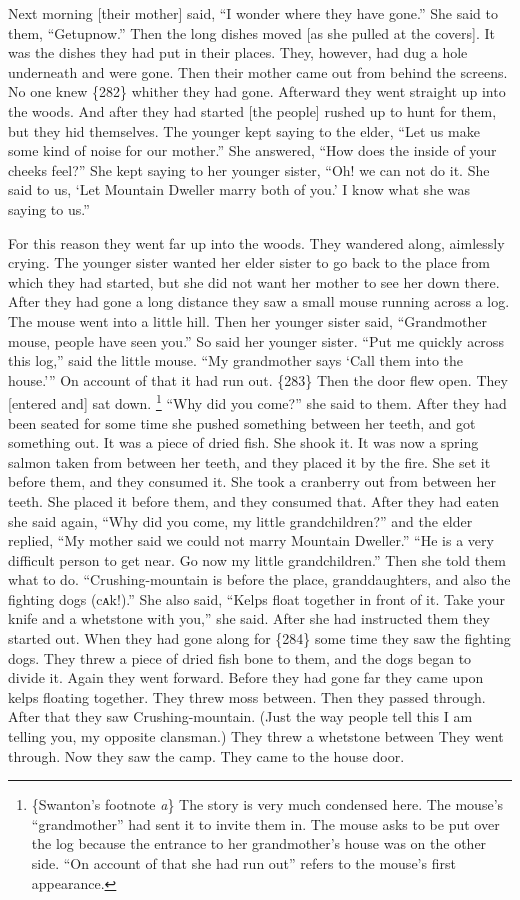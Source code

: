 Next morning [their mother] said,
“I wonder where they have gone.”
She said to them,
“Getupnow.”
Then the long dishes moved [as she pulled at the covers].
It was the dishes they had put in their places.
They, however, had dug a hole underneath and were gone.
Then their mother came out from behind the screens.
No one knew \{282\} whither they had gone.
Afterward they went straight up into the woods.
And after they had started [the people] rushed up to hunt for them, but they hid themselves.
The younger kept saying to the elder,
“Let us make some kind of noise for our mother.”
She answered,
“How does the inside of your cheeks feel?”
She kept saying to her younger sister,
“Oh! we can not do it.
She said to us,
‘Let Mountain Dweller marry both of you.’
I know what she was saying to us.”

For this reason they went far up into the woods.
They wandered along, aimlessly crying.
The younger sister wanted her elder sister to go back to the place from which they had started, but she did not want her mother to see her down there.
After they had gone a long distance they saw a small mouse running across a log.
The mouse went into a little hill.
Then her younger sister said,
“Grandmother mouse, people have seen you.”
So said her younger sister.
“Put me quickly across this log,”
said the little mouse.
“My grandmother says
‘Call them into the house.’”
On account of that it had run out.
\{283\}
Then the door flew open.
They [entered and] sat down.%
\footnote{\{Swanton’s footnote \textit{a}\}
The story is very much condensed here.
The mouse’s “grandmother” had sent it to invite them in.
The mouse asks to be put over the log because the entrance to her grandmother’s house was on the other side.
“On account of that she had run out” refers to the mouse’s first appearance.}
“Why did you come?”
she said to them.
After they had been seated for some time she pushed something between her teeth, and got something out.
It was a piece of dried fish.
She shook it.
It was now a spring salmon taken from between her teeth, and they placed it by the fire.
She set it before them, and they consumed it.
She took a cranberry out from between her teeth.
She placed it before them, and they consumed that.
After they had eaten she said again,
“Why did you come, my little grandchildren?”
and the elder replied,
“My mother said we could not marry Mountain Dweller.”
“He is a very difficult person to get near.
Go now my little grandchildren.”
Then she told them what to do.
“Crushing-mountain is before the place, granddaughters, and also the fighting dogs (cᴀk!).”
She also said,
“Kelps float together in front of it.
Take your knife and a whetstone with you,”
she said.
After she had instructed them they started out.
When they had gone along for
\{284\}
some time they saw the fighting dogs.
They threw a piece of dried fish bone to them, and the dogs began to divide it.
Again they went forward.
Before they had gone far they came upon kelps floating together.
They threw moss between.
Then they passed through.
After that they saw Crushing-mountain.
(Just the way people tell this I am telling you, my opposite clansman.)
They threw a whetstone between 
They went through.
Now they saw the camp.
They came to the house door.

